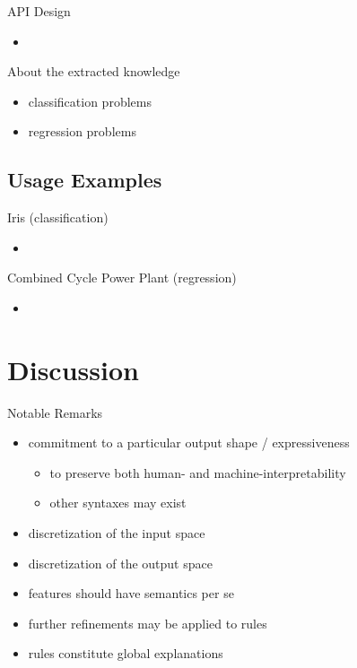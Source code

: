 \documentclass[presentation]{beamer}\mode<presentation>{\usetheme{AMSBolognaFC}}
\begin{document}
\begin{frame}{API Design}
    \begin{itemize}
        \item 
    \end{itemize}
\end{frame}

\begin{frame}{About the extracted knowledge}
    \begin{itemize}
        \item classification problems
        \item regression problems
    \end{itemize}
\end{frame}

\subsection{Usage Examples}

\begin{frame}{Iris (classification)}
    \begin{itemize}
        \item 
    \end{itemize}
\end{frame}

\begin{frame}{Combined Cycle Power Plant (regression)}
    \begin{itemize}
        \item 
    \end{itemize}
\end{frame}

\section{Discussion}

\begin{frame}{Notable Remarks}
    \begin{itemize}
        \item commitment to a particular output shape / expressiveness
        \begin{itemize}
            \item to preserve both human- and machine-interpretability
            \item other syntaxes may exist
        \end{itemize}
        \item discretization of the input space
        \item discretization of the output space
        \item features should have semantics per se
        \item further refinements may be applied to rules
        \item rules constitute global explanations
    \end{itemize}
\end{frame}
\end{document}

